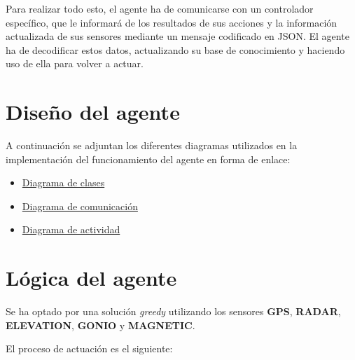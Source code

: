 \documentclass[11pt,a4paper]{article}
\begin{document}
Para realizar todo esto, el agente ha de comunicarse con un controlador específico, que le informará de los resultados de sus acciones y la información actualizada
de sus sensores mediante un mensaje codificado en JSON. El agente ha de decodificar estos datos, actualizando su base de conocimiento y haciendo uso de ella para 
volver a actuar.

\section{Diseño del agente}

A continuación se adjuntan los diferentes diagramas utilizados en la implementación del funcionamiento del agente en forma de enlace:
\begin{itemize}
	\item \href{https://drive.google.com/open?id=1AVGlVi7iFwF_wf06LgfKT3ENoQBaMscI} {Diagrama de clases}
	\item \href{https://drive.google.com/open?id=1Np2DMOF74VwDmPBNyue3_3VKu_a10eLy} {Diagrama de comunicación}
	\item \href{https://drive.google.com/open?id=1IwIZwNYwJSlLvSVjxOjM7ngV2bpRHg42} {Diagrama de actividad}
\end{itemize}

\section{Lógica del agente}

Se ha optado por una solución \textit{greedy} utilizando los sensores \textbf{GPS}, \textbf{RADAR}, \textbf{ELEVATION}, \textbf{GONIO} y \textbf{MAGNETIC}.

El proceso de actuación es el siguiente:
\end{document}
